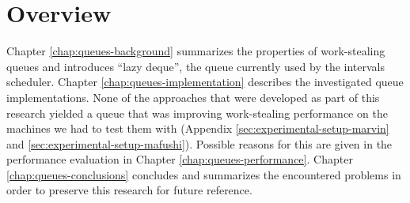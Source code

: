 \section{Overview}
\label{sec:queues-intro-overview}

Chapter \ref{chap:queues-background} summarizes the properties of
work-stealing queues and introduces ``lazy deque'', the queue
currently used by the intervals scheduler. Chapter
\ref{chap:queues-implementation} describes the investigated queue
implementations. None of the approaches that were developed as part of
this research yielded a queue that was improving work-stealing
performance on the machines we had to test them with (Appendix
\ref{sec:experimental-setup-marvin} and
\ref{sec:experimental-setup-mafushi}). Possible reasons for this are
given in the performance evaluation in Chapter
\ref{chap:queues-performance}. Chapter \ref{chap:queues-conclusions}
concludes and summarizes the encountered problems in order to preserve
this research for future reference.


